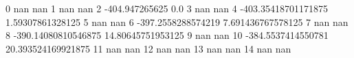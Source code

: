 0 nan nan
1 nan nan
2 -404.947265625 0.0
3 nan nan
4 -403.35418701171875 1.59307861328125
5 nan nan
6 -397.2558288574219 7.691436767578125
7 nan nan
8 -390.14080810546875 14.80645751953125
9 nan nan
10 -384.5537414550781 20.393524169921875
11 nan nan
12 nan nan
13 nan nan
14 nan nan
